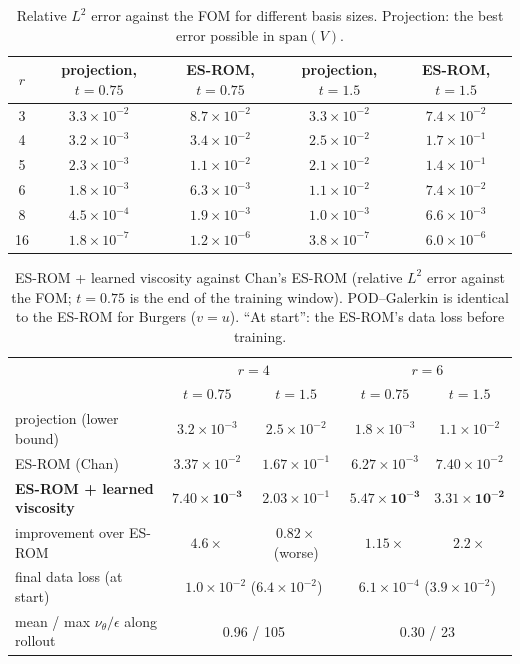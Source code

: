 \documentclass[11pt,a4paper]{article}
\begin{document}
\begin{table}[h]\centering
\caption{Relative $L^2$ error against the FOM for different basis sizes. Projection: the best error possible in $\mathrm{span}(V)$.}\label{tab:rscan}
\begin{tabular}{ccccc}
\toprule
$r$ & projection, $t=0.75$ & ES-ROM, $t=0.75$ & projection, $t=1.5$ & ES-ROM, $t=1.5$\\\midrule
3 & $3.3\times10^{-2}$ & $8.7\times10^{-2}$ & $3.3\times10^{-2}$ & $7.4\times10^{-2}$\\
4 & $3.2\times10^{-3}$ & $3.4\times10^{-2}$ & $2.5\times10^{-2}$ & $1.7\times10^{-1}$\\
5 & $2.3\times10^{-3}$ & $1.1\times10^{-2}$ & $2.1\times10^{-2}$ & $1.4\times10^{-1}$\\
6 & $1.8\times10^{-3}$ & $6.3\times10^{-3}$ & $1.1\times10^{-2}$ & $7.4\times10^{-2}$\\
8 & $4.5\times10^{-4}$ & $1.9\times10^{-3}$ & $1.0\times10^{-3}$ & $6.6\times10^{-3}$\\
16 & $1.8\times10^{-7}$ & $1.2\times10^{-6}$ & $3.8\times10^{-7}$ & $6.0\times10^{-6}$\\
\bottomrule
\end{tabular}
\end{table}

\begin{table}[h]\centering
\caption{ES-ROM + learned viscosity against Chan's ES-ROM (relative $L^2$ error against the FOM; $t=0.75$ is the end of the training window). POD--Galerkin is identical to the ES-ROM for Burgers ($v=u$). ``At start'': the ES-ROM's data loss before training.}\label{tab:closure}
\begin{tabular}{lcccc}
\toprule
& \multicolumn{2}{c}{$r=4$} & \multicolumn{2}{c}{$r=6$}\\
& $t=0.75$ & $t=1.5$ & $t=0.75$ & $t=1.5$\\\midrule
projection (lower bound) & $3.2\times10^{-3}$ & $2.5\times10^{-2}$ & $1.8\times10^{-3}$ & $1.1\times10^{-2}$\\
ES-ROM (Chan) & $3.37\times10^{-2}$ & $1.67\times10^{-1}$ & $6.27\times10^{-3}$ & $7.40\times10^{-2}$\\
\textbf{ES-ROM + learned viscosity} & $\mathbf{7.40\times10^{-3}}$ & $2.03\times10^{-1}$ & $\mathbf{5.47\times10^{-3}}$ & $\mathbf{3.31\times10^{-2}}$\\
improvement over ES-ROM & $4.6\times$ & $0.82\times$ (worse) & $1.15\times$ & $2.2\times$\\\midrule
final data loss (at start) & \multicolumn{2}{c}{$1.0\times10^{-2}$ ($6.4\times10^{-2}$)} & \multicolumn{2}{c}{$6.1\times10^{-4}$ ($3.9\times10^{-2}$)}\\
mean / max $\nu_\theta/\epsilon$ along rollout & \multicolumn{2}{c}{0.96 / 105} & \multicolumn{2}{c}{0.30 / 23}\\
\bottomrule
\end{tabular}
\end{table}
\end{document}

